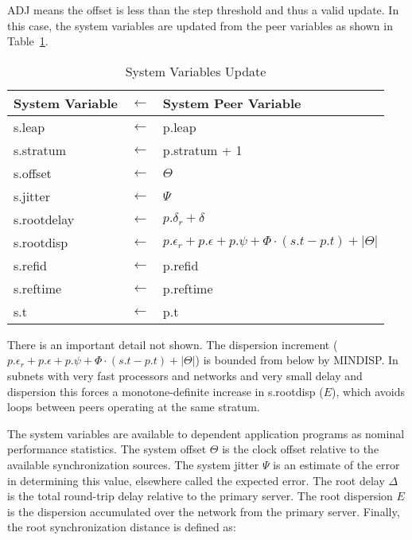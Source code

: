 ADJ means the offset is less than the step threshold and thus a valid
update. In this case, the system variables are updated from the peer
variables as shown in Table~\ref{system_variables_update}.

\begin{table}[htb]
\center
\begin{tabular}{| l c l |}
\hline
System Variable & $ \leftarrow $ & System Peer Variable \\
\hline
\hline
s.leap      & $ \leftarrow $ & p.leap                    \\
s.stratum   & $ \leftarrow $ & p.stratum + 1             \\
s.offset    & $ \leftarrow $ & $ \Theta $                     \\
s.jitter    & $ \leftarrow $ & $ \Psi $                       \\
s.rootdelay & $ \leftarrow $ & $ p.\delta_r + \delta $         \\
s.rootdisp  & $ \leftarrow $ & $ p.\epsilon_r + p.\epsilon + p.\psi + \Phi \cdot (s.t - p.t) + |\Theta| $ \\
s.refid     & $ \leftarrow $ & p.refid                   \\
s.reftime   & $ \leftarrow $ & p.reftime                 \\
s.t         & $ \leftarrow $ & p.t                       \\
\hline
\end{tabular}
\caption{System Variables Update}
\label{system_variables_update}
\end{table}

There is an important detail not shown. The dispersion increment
($ p.\epsilon_r + p.\epsilon + p.\psi + \Phi \cdot (s.t - p.t) + |\Theta| $) is bounded from
below by MINDISP. In subnets with very fast processors and networks
and very small delay and dispersion this forces a monotone-definite
increase in s.rootdisp ($ E $), which avoids loops between peers
operating at the same stratum.

The system variables are available to dependent application programs
as nominal performance statistics. The system offset $ \Theta $ is the
clock offset relative to the available synchronization sources. The
system jitter $ \Psi $ is an estimate of the error in determining this
value, elsewhere called the expected error. The root delay $ \Delta $ is
the total round-trip delay relative to the primary server. The root
dispersion $ E $ is the dispersion accumulated over the network
from the primary server. Finally, the root synchronization distance
is defined as:

